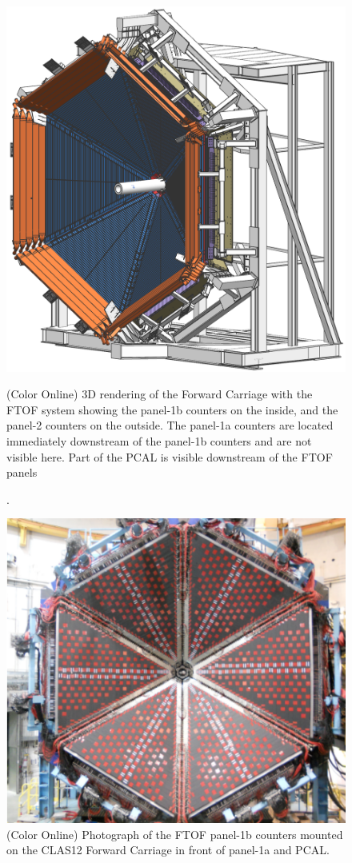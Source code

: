 \documentclass[final,3p,twocolumn]{elsarticle}
\begin{document}
\begin{figure}[htbp!]
\includegraphics[width=0.95\columnwidth]{fwd_carriage-1.png}
\caption{(Color Online) 3D rendering of the Forward Carriage with the FTOF system showing the panel-1b counters on the
inside, and the panel-2 counters on the outside. The panel-1a counters are located immediately downstream of the
panel-1b counters and are not visible here. Part of the PCAL is visible downstream of the FTOF panels}. 

\vspace{0.5cm} \includegraphics[width=1.0\columnwidth]{FTOF-1b.png}
\caption { (Color Online) Photograph of the FTOF panel-1b counters mounted on the CLAS12 Forward Carriage 
in front of panel-1a and PCAL.} 
\label{ftof-1b}
\end{figure}
\end{document}

